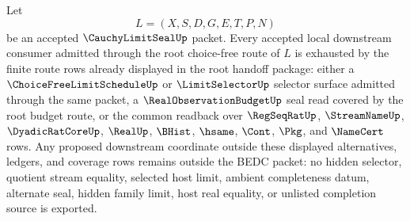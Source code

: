 \begin{theorem}
\label{thm:cauchy-limit-seal-root-choice-free-downstream-coverage}
Let
$$
L=(X,S,D,G,E,T,P,N)
$$
be an accepted $\CauchyLimitSealUp$ packet. Every accepted local downstream consumer admitted through the root choice-free route of $L$ is exhausted by the finite route rows already displayed in the root handoff package: either a $\ChoiceFreeLimitScheduleUp$ or $\LimitSelectorUp$ selector surface admitted through the same packet, a $\RealObservationBudgetUp$ seal read covered by the root budget route, or the common readback over $\RegSeqRatUp$, $\StreamNameUp$, $\DyadicRatCoreUp$, $\RealUp$, $\BHist$, $\hsame$, $\Cont$, $\Pkg$, and $\NameCert$ rows. Any proposed downstream coordinate outside these displayed alternatives, ledgers, and coverage rows remains outside the BEDC packet: no hidden selector, quotient stream equality, selected host limit, ambient completeness datum, alternate seal, hidden family limit, host real equality, or unlisted completion source is exported.
\end{theorem}
